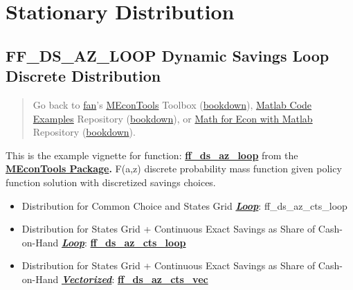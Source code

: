 \documentclass[
]{book}
\begin{document}
\hypertarget{stationary-distribution}{%
\chapter{Stationary Distribution}\label{stationary-distribution}}

\hypertarget{ff_ds_az_loop-dynamic-savings-loop-discrete-distribution}{%
\section{FF\_DS\_AZ\_LOOP Dynamic Savings Loop Discrete Distribution}\label{ff_ds_az_loop-dynamic-savings-loop-discrete-distribution}}

\begin{quote}
Go back to \href{http://fanwangecon.github.io/}{fan}'s \href{https://fanwangecon.github.io/MEconTools/}{MEconTools} Toolbox (\href{https://fanwangecon.github.io/MEconTools/bookdown}{bookdown}), \href{https://fanwangecon.github.io/M4Econ/}{Matlab Code Examples} Repository (\href{https://fanwangecon.github.io/M4Econ/bookdown}{bookdown}), or \href{https://fanwangecon.github.io/Math4Econ/}{Math for Econ with Matlab} Repository (\href{https://fanwangecon.github.io/Math4Econ/bookdown}{bookdown}).
\end{quote}

This is the example vignette for function:
\href{https://github.com/FanWangEcon/MEconTools/blob/master/MEconTools/vfi/ff_ds_az_loop.m}{\textbf{ff\_ds\_az\_loop}}
from the \href{https://fanwangecon.github.io/MEconTools/}{\textbf{MEconTools
Package}}\textbf{.} F(a,z)
discrete probability mass function given policy function solution with
discretized savings choices.

\begin{itemize}
\item
  Distribution for Common Choice and States Grid \underline{\textbf{\emph{Loop}}}:
  ff\_ds\_az\_cts\_loop
\item
  Distribution for States Grid + Continuous Exact Savings as Share of
  Cash-on-Hand \underline{\textbf{\emph{Loop}}}:
  \href{https://github.com/FanWangEcon/MEconTools/blob/master/MEconTools/vfi/ff_ds_az_cts_loop.m}{\textbf{ff\_ds\_az\_cts\_loop}}
\item
  Distribution for States Grid + Continuous Exact Savings as Share of
  Cash-on-Hand \underline{\textbf{\emph{Vectorized}}}:
  \href{https://github.com/FanWangEcon/MEconTools/blob/master/MEconTools/vfi/ff_ds_az_cts_vec.m}{\textbf{ff\_ds\_az\_cts\_vec}}
\end{itemize}
\end{document}
